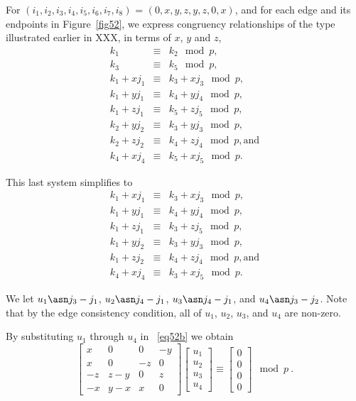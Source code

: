 For $(i_1,i_2,i_3,i_4,i_5,i_6,i_7,i_8)$ = $(0,x,y,z,y,z,0,x)$, and
for each edge and its endpoints in Figure~\ref{fig52}, we express
congruency relationships of the type illustrated earlier in XXX,
in terms of $x$, $y$ and $z$,
\begin{equation}\label{eq52a}\begin{array}{cccc}
k_1 &\equiv& k_2 \mod p,\\
k_3 &\equiv& k_5 \mod p,\\
k_1+xj_1 &\equiv& k_3+xj_3 \mod p, \\
k_1+yj_1 &\equiv& k_4+yj_4 \mod p, \\
k_1+zj_1 &\equiv& k_5+zj_5 \mod p, \\
k_2+yj_2 &\equiv& k_3+yj_3 \mod p, \\
k_2+zj_2 &\equiv& k_4+zj_4 \mod p, \text{and}\\
k_4+xj_4 &\equiv& k_5+xj_5 \mod p.
\end{array}\end{equation}

This last system simplifies to
\begin{equation}\label{eq52b}\begin{array}{cccc}
k_1+xj_1 &\equiv& k_3+xj_3 \mod p, \\
k_1+yj_1 &\equiv& k_4+yj_4 \mod p, \\
k_1+zj_1 &\equiv& k_3+zj_5 \mod p, \\
k_1+yj_2 &\equiv& k_3+yj_3 \mod p, \\
k_1+zj_2 &\equiv& k_4+zj_4 \mod p, \text{and}\\
k_4+xj_4 &\equiv& k_3+xj_5 \mod p.
\end{array}\end{equation}

We let $u_1 \asn j_3 -j_1$, $u_2\asn j_4 -j_1$, $u_3 \asn j_4
-j_1$, and $u_4 \asn j_3 -j_2$. Note that by the edge consistency
condition, all of $u_1$, $u_2$, $u_3$, and $u_4$ are non-zero.

By substituting $u_1$ through $u_4$ in ~\eqref{eq52b} we obtain
\begin{equation}\label{sys52a}
\left[ \begin{array}{ccccccc} x & 0 & 0 & -y\\
x & 0 & -z &0\\
-z & z-y &0 & z\\
-x & y-x & x & 0
\end{array}\right] \left[\begin{array}{c}
u_1\\u_2\\u_3\\u_4 \end{array}\right] \equiv
\left[\begin{array}{c}0\\0\\0\\0\end{array}\right] \mod p~.
\end{equation}

